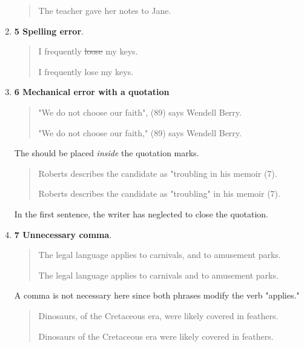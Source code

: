 \begin{enumerate}
\begin{quote}
The teacher gave her notes to Jane.  

\end{quote}

\item \textbf{5 Spelling error}.

\begin{quote}
I frequently \sout{loose} my keys. 

I frequently lose my keys. 

\end{quote}

\item \textbf{6 Mechanical error with a quotation}

\begin{quote}
"We do not choose our faith", (89) says Wendell Berry. 

"We do not choose our faith," (89) says Wendell Berry. 
\end{quote}

 The should be placed \emph{inside} the quotation marks.

\medskip

\begin{quote}
Roberts describes the candidate as "troubling in his memoir (7). 

Roberts describes the candidate as "troubling" in his memoir (7). 

\end{quote}

 In the first sentence, the writer has neglected to close the quotation.

\item \textbf{7 Unnecessary comma}.

\begin{quote}
The legal language applies to carnivals, and to amusement parks.   

The legal language applies to carnivals and to amusement parks.   
\end{quote}

 A comma is not necessary here since both phrases modify the verb "applies."

\medskip

\begin{quote}
Dinosaurs, of the Cretaceous era, were likely covered in feathers.   

Dinosaurs of the Cretaceous era were likely covered in feathers.   


\end{quote}
\end{enumerate}
